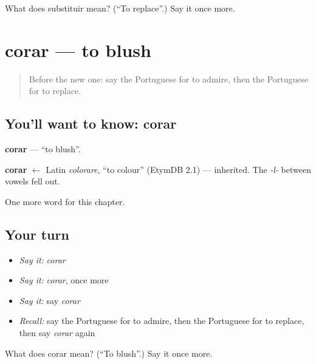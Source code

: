 \begin{tcolorbox}[breakable,colback=teal!4,colframe=teal!35!black,title={Before you move on}]
What does substituir mean? (\textquotedblleft{}To replace\textquotedblright{}.) Say it once more.
\end{tcolorbox}
\section[corar]{corar — to blush}

\label{lesson:PT-C147-corar}



\begin{quote}
Before the new one: say the Portuguese for to admire, then the Portuguese for to replace.
\end{quote}

\subsection*{You'll want to know: corar}
\textbf{corar} — \textquotedblleft{}to blush\textquotedblright{}.

\begin{cousinweb}
\textbf{corar} $\leftarrow$ Latin \emph{colorare}, \textquotedblleft{}to colour\textquotedblright{} (EtymDB 2.1) — inherited. The \emph{-l-} between vowels fell out.
\end{cousinweb}

\begin{grammarlens}[title={What you've built}]
One more word for this chapter.
\end{grammarlens}

\subsection*{Your turn}
\begin{itemize}
\raggedright
  \item \emph{Say it:} \emph{corar}
  \item \emph{Say it:} \emph{corar}, once more
  \item \emph{Say it:} say \emph{corar}
  \item \emph{Recall:} say the Portuguese for to admire, then the Portuguese for to replace, then say \emph{corar} again
\end{itemize}

\begin{tcolorbox}[breakable,colback=teal!4,colframe=teal!35!black,title={Before you move on}]
What does corar mean? (\textquotedblleft{}To blush\textquotedblright{}.) Say it once more.
\end{tcolorbox}
